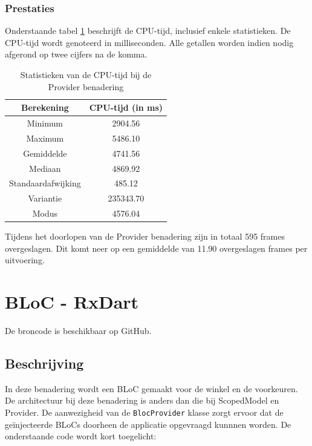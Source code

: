 \subsubsection{Prestaties}
Onderstaande tabel \ref{table:experiment-provider-statistics} beschrijft de CPU-tijd, inclusief enkele statistieken. De CPU-tijd wordt genoteerd in milliseconden. Alle getallen worden indien nodig afgerond op twee cijfers na de komma.
\begin{table}[H]
    \centering
    \begin{tabular}{c|c}
        \textbf{Berekening} & \textbf{CPU-tijd (in ms)}  \\ \hline
        Minimum             & 2904.56                    \\ \hline
        Maximum             & 5486.10                    \\ \hline
        Gemiddelde          & 4741.56                    \\ \hline
        Mediaan             & 4869.92                    \\ \hline
        Standaardafwijking  & 485.12                     \\ \hline
        Variantie           & 235343.70                  \\ \hline
        Modus               & 4576.04                      \\                
    \end{tabular}
    \caption{Statistieken van de CPU-tijd bij de Provider benadering}
    \label{table:experiment-provider-statistics}
\end{table}

Tijdens het doorlopen van de Provider benadering zijn in totaal 595 frames overgeslagen. Dit komt neer op een gemiddelde van 11.90 overgeslagen frames per uitvoering.

\section{BLoC - RxDart}
De broncode is beschikbaar op GitHub. \autocite{DeVrient2019c}
\subsection{Beschrijving}
In deze benadering wordt een BLoC gemaakt voor de winkel en de voorkeuren. De architectuur bij deze benadering is anders dan die bij ScopedModel en Provider. 
De aanwezigheid van de \verb|BlocProvider| klasse zorgt ervoor dat de geïnjecteerde BLoCs doorheen de applicatie opgevraagd kunnnen worden. \newline \newline
De onderstaande code wordt kort toegelicht:

